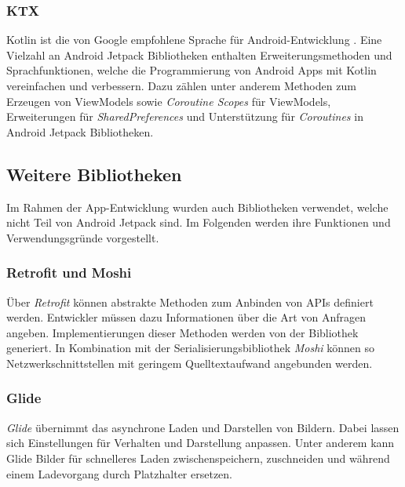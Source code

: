 \subsubsection{KTX}
\label{subsubsec:app:jetpack:extensions}
Kotlin ist die von Google empfohlene Sprache für Android-Entwicklung \autocite{androidkotlin}.
Eine Vielzahl an Android Jetpack Bibliotheken enthalten Erweiterungsmethoden und Sprachfunktionen, welche die Programmierung von Android Apps mit Kotlin vereinfachen und verbessern.
Dazu zählen unter anderem Methoden zum Erzeugen von ViewModels sowie \textit{Coroutine Scopes} für ViewModels, Erweiterungen für \textit{SharedPreferences} und Unterstützung für \textit{Coroutines} in Android Jetpack Bibliotheken.

\subsection{Weitere Bibliotheken}
\label{subsec:app:bibs}
Im Rahmen der App-Entwicklung wurden auch Bibliotheken verwendet, welche nicht Teil von Android Jetpack sind.
Im Folgenden werden ihre Funktionen und Verwendungsgründe vorgestellt.

\subsubsection{Retrofit und Moshi}
\label{subsubsec:app:bibs:retrofitmoshi}
Über \textit{Retrofit} können abstrakte Methoden zum Anbinden von APIs definiert werden.
Entwickler müssen dazu Informationen über die Art von Anfragen angeben.
Implementierungen dieser Methoden werden von der Bibliothek generiert.
In Kombination mit der Serialisierungsbibliothek \textit{Moshi} können so Netzwerkschnittstellen mit geringem Quelltextaufwand angebunden werden.

\subsubsection{Glide}
\label{subsubsec:app:bibs:glide}
\textit{Glide} übernimmt das asynchrone Laden und Darstellen von Bildern.
Dabei lassen sich Einstellungen für Verhalten und Darstellung anpassen.
Unter anderem kann Glide Bilder für schnelleres Laden zwischenspeichern, zuschneiden und während einem Ladevorgang durch Platzhalter ersetzen.

